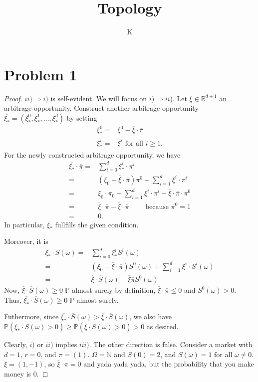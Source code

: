 \documentclass[a4paper]{article}
\title{Topology}
\author{K}
\theoremstyle{definition}
\begin{document}
\section*{Problem 1}
\begin{proof}
    \(ii) \Rightarrow i)\) is self-evident. We will focus on \(i) \Rightarrow ii)\). Let \(\overline{\xi} \in \mathbb{R}^{d + 1}\) an arbitrage opportunity. Construct another arbitrage opportunity \(\overline{\xi_*} = (\xi_*^0, \xi_*^1, \ldots, \xi_*^d)\) by setting
    \begin{align*}
        \xi_*^0 =& \xi^0 - \overline{\xi} \cdot \overline{\pi} \\
        \xi_*^i =& \xi^i \text{ for all } i \geq 1 \text{.}
    \end{align*}
    For the newly constructed arbitrage opportunity, we have
    \begin{align*}
        \overline{\xi_*} \cdot \overline{\pi} =& \sum_{i = 0}^d \xi_*^i \cdot \pi^i \\
        =& \left(\xi_0 - \overline{\xi} \cdot \overline{\pi}\right) \pi^0 + \sum_{i = 1}^d \xi^i \cdot \pi^i \\
        =& \xi_0 \cdot \pi_0 + \sum_{i = 1}^d \xi^i \cdot \pi^i - \overline{\xi} \cdot \overline{\pi} \cdot \pi^0 \\
        =& \overline{\xi} \cdot \overline{\pi} - \overline{\xi} \cdot \overline{\pi} \qquad \text{ because \(\pi^0 = 1\)} \\
        =& 0 \text{.}
    \end{align*}
    In particular, \(\xi_*\) fullfills the given condition.

    Moreover, it is
    \begin{align*}
        \overline{\xi_*} \cdot \overline{S}(\omega) =& \sum_{i = 0}^d \xi_*^i S^i(\omega) \\
        =& (\xi_0 - \overline{\xi} \cdot \overline{\pi}) S^0(\omega) + \sum_{i = 1}^d \xi^i \cdot S^i(\omega) \\
        =& \overline{\xi} \cdot \overline{S}(\omega) - \overline{\xi} \overline{\pi} S^0 (\omega)
    \end{align*}
    Now, \(\overline{\xi} \cdot \overline{S}(\omega) \geq 0\) \(\mathbb{P}\)-almost surely by definition, \(\overline{\xi} \cdot \overline{\pi} \leq 0\) and \(S^0(\omega) > 0\). Thus, \(\overline{\xi_*} \cdot \overline{S}(\omega) \geq 0\) \(\mathbb{P}\)-almost surely.

    Futhermore, since \(\overline{\xi_*} \cdot \overline{S}(\omega) > \overline{\xi} \cdot \overline{S}(\omega)\), we also have \(\mathbb{P}(\overline{\xi_*} \cdot \overline{S}(\omega) > 0) \geq \mathbb{P}(\overline{\xi} \cdot \overline{S}(\omega) > 0) > 0\) as desired.

    Clearly, \(i)\) or \(ii)\) implies \(iii)\). The other direction is false. Consider a market with \(d = 1\), \(r = 0\), and \(\pi = (1)\). \(\Omega = \mathbb{N}\) and \(S(0) = 2\), and \(S(\omega) = 1\) for all \(\omega \neq 0\). \(\xi = (1, -1)\), so \(\overline{\xi} \cdot \pi = 0\) and yada yada yada, but the probability that you make money is \(0\).
\end{proof}
\newpage
\end{document}

